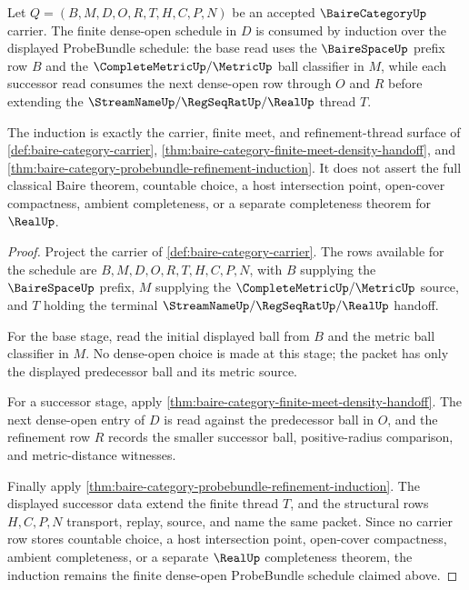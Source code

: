 \begin{theorem}
\label{thm:bairecategory-probebundle-dense-open-induction}
Let $Q=(B,M,D,O,R,T,H,C,P,N)$ be an accepted $\BaireCategoryUp$ carrier. The finite dense-open schedule in $D$ is consumed by induction over the displayed ProbeBundle schedule: the base read uses the $\BaireSpaceUp$ prefix row $B$ and the $\CompleteMetricUp/\MetricUp$ ball classifier in $M$, while each successor read consumes the next dense-open row through $O$ and $R$ before extending the $\StreamNameUp/\RegSeqRatUp/\RealUp$ thread $T$.

The induction is exactly the carrier, finite meet, and refinement-thread surface of \autoref{def:baire-category-carrier}, \autoref{thm:baire-category-finite-meet-density-handoff}, and \autoref{thm:baire-category-probebundle-refinement-induction}. It does not assert the full classical Baire theorem, countable choice, a host intersection point, open-cover compactness, ambient completeness, or a separate completeness theorem for $\RealUp$.
\end{theorem}
\begin{proof}
Project the carrier of \autoref{def:baire-category-carrier}. The rows available for the schedule are $B,M,D,O,R,T,H,C,P,N$, with $B$ supplying the $\BaireSpaceUp$ prefix, $M$ supplying the $\CompleteMetricUp/\MetricUp$ source, and $T$ holding the terminal $\StreamNameUp/\RegSeqRatUp/\RealUp$ handoff.

For the base stage, read the initial displayed ball from $B$ and the metric ball classifier in $M$. No dense-open choice is made at this stage; the packet has only the displayed predecessor ball and its metric source.

For a successor stage, apply \autoref{thm:baire-category-finite-meet-density-handoff}. The next dense-open entry of $D$ is read against the predecessor ball in $O$, and the refinement row $R$ records the smaller successor ball, positive-radius comparison, and metric-distance witnesses.

Finally apply \autoref{thm:baire-category-probebundle-refinement-induction}. The displayed successor data extend the finite thread $T$, and the structural rows $H,C,P,N$ transport, replay, source, and name the same packet. Since no carrier row stores countable choice, a host intersection point, open-cover compactness, ambient completeness, or a separate $\RealUp$ completeness theorem, the induction remains the finite dense-open ProbeBundle schedule claimed above.
\end{proof}

